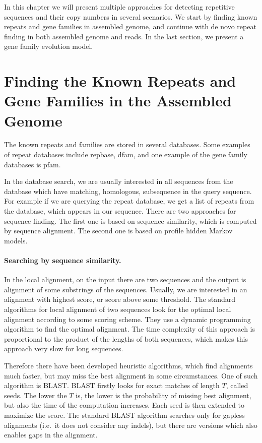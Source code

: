 In this chapter we will present multiple approaches for detecting repetitive sequences and their copy numbers in several scenarios. We start by finding known repeats and gene families in assembled genome, and continue with de novo repeat finding in both assembled genome and reads. In the last section, we present a gene family evolution model.

\section[Known Repeats in Assem\dots]{Finding the Known Repeats and Gene Families in the Assembled Genome}

The known repeats and families are stored in several databases. Some examples of repeat databases include repbase\cite{repbase}, dfam\cite{dfam}, and one example of the gene family databases is pfam\cite{pfam}.

In the database search, we are usually interested in all  sequences from the database which have matching, homologous, subsequence in the query sequence. For example if we are querying the repeat database, we get a list of repeats from the database, which appears in our sequence.
There are two approaches for sequence finding. The first one is based on sequence similarity, which is computed by sequence alignment. The second one is based on profile hidden Markov models.

\paragraph{Searching by sequence similarity.}
In the local alignment, on the input there are two sequences and the output is alignment of some substrings of the sequences. Usually, we are interested in an alignment with highest score, or score above some threshold.
The standard algorithms for local alignment of two sequences look for the optimal local alignment according to some scoring scheme. They use a dynamic programming algorithm to find the optimal alignment. The time complexity of this approach is proportional to the product of the lengths of both sequences, which makes this approach very slow for long sequences.

Therefore there have been developed heuristic algorithms, which find alignments much faster, but may miss the best alignment in some circumstances. One of such algorithm is BLAST\cite{blast}.
BLAST firstly looks for exact matches of length $T$, called seeds. The lower the $T$ is, the lower is the probability of missing best alignment, but also the time of the computation increases.
Each seed is then extended to maximize the score. The standard BLAST algorithm searches only for gapless alignments (i.e.\ it does not consider any indels), but there are versions which also enables gaps in the alignment.

